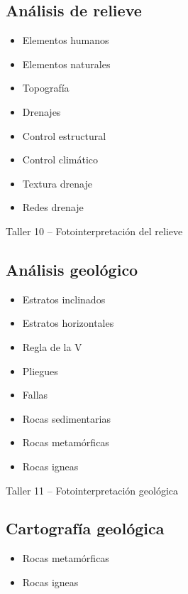 \documentclass[a4paper,twoside,11pt,]{article}
\begin{document}
\subsection {Análisis de relieve}
\begin{itemize}
\item Elementos humanos 
\item Elementos naturales
\item Topografía
\item Drenajes
\item Control estructural
\item Control climático
\item Textura drenaje
\item Redes drenaje
\end{itemize}

\begin{tcolorbox}[enhanced,width=5in,center upper,  fontupper=\large\bfseries,drop shadow southwest,sharp corners]
Taller 10 -- Fotointerpretación del relieve
\end{tcolorbox}

\subsection {Análisis geológico}
\begin{itemize}
\item Estratos inclinados
\item Estratos horizontales
\item Regla de la V
\item Pliegues
\item Fallas 
\item Rocas sedimentarias
\item Rocas metamórficas
\item Rocas igneas
\end{itemize}

\begin{tcolorbox}[enhanced,width=5in,center upper,  fontupper=\large\bfseries,drop shadow southwest,sharp corners]
Taller 11 -- Fotointerpretación geológica
\end{tcolorbox}

\subsection {Cartografía geológica}
\begin{itemize}
\item Rocas metamórficas
\item Rocas igneas
\end{itemize}
\end{document}
